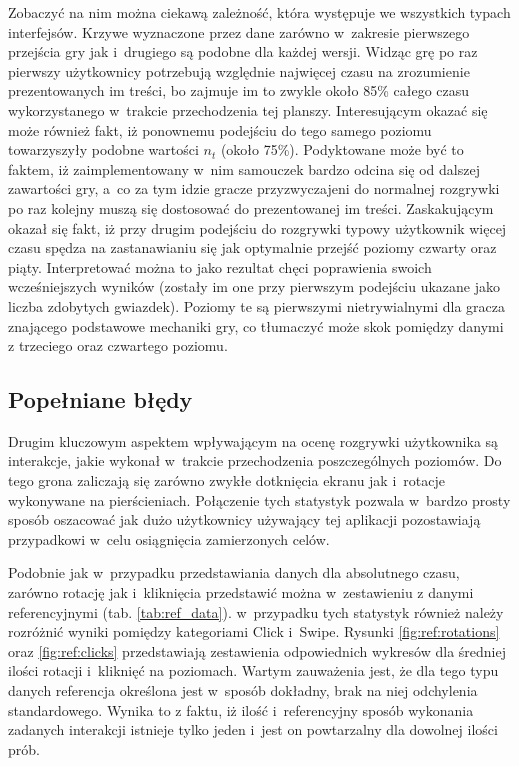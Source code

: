 \documentclass[a4paper,12pt,numbers=noenddot]{report}
\begin{document}
Zobaczyć na nim można ciekawą zależność, która występuje we wszystkich typach interfejsów. Krzywe wyznaczone przez dane zarówno w~zakresie pierwszego przejścia gry jak i~drugiego są podobne dla każdej wersji. Widząc grę po raz pierwszy użytkownicy potrzebują względnie najwięcej czasu na zrozumienie prezentowanych im treści, bo zajmuje im to zwykle około 85\% całego czasu wykorzystanego w~trakcie przechodzenia tej planszy. Interesującym okazać się może również fakt, iż ponownemu podejściu do tego samego poziomu towarzyszyły podobne wartości $n_{t}$ (około 75\%). Podyktowane może być to faktem, iż zaimplementowany w~nim samouczek bardzo odcina się od dalszej zawartości gry, a~co za tym idzie gracze przyzwyczajeni do normalnej rozgrywki po raz kolejny muszą się dostosować do prezentowanej im treści.
Zaskakującym okazał się fakt, iż przy drugim podejściu do rozgrywki typowy użytkownik więcej czasu spędza na zastanawianiu się jak optymalnie przejść poziomy czwarty oraz piąty. Interpretować można to jako rezultat chęci poprawienia swoich wcześniejszych wyników (zostały im one przy pierwszym podejściu ukazane jako liczba zdobytych gwiazdek). Poziomy te są pierwszymi nietrywialnymi dla gracza znającego podstawowe mechaniki gry, co tłumaczyć może skok pomiędzy danymi z trzeciego oraz czwartego poziomu. \\

\subsection{Popełniane błędy}
Drugim kluczowym aspektem wpływającym na ocenę rozgrywki użytkownika są interakcje, jakie wykonał w~trakcie przechodzenia poszczególnych poziomów. Do tego grona zaliczają się zarówno zwykłe dotknięcia ekranu jak i~rotacje wykonywane na pierścieniach. Połączenie tych statystyk pozwala w~bardzo prosty sposób oszacować jak dużo użytkownicy używający tej aplikacji pozostawiają przypadkowi w~celu osiągnięcia zamierzonych celów. 

Podobnie jak w~przypadku przedstawiania danych dla absolutnego czasu, zarówno rotację jak i~kliknięcia przedstawić można w~zestawieniu z danymi referencyjnymi (tab. \ref{tab:ref_data}). w~przypadku tych statystyk również należy rozróżnić wyniki pomiędzy kategoriami Click i~Swipe. Rysunki
\ref{fig:ref:rotations} oraz \ref{fig:ref:clicks} przedstawiają zestawienia odpowiednich wykresów dla średniej ilości rotacji i~kliknięć na poziomach. Wartym zauważenia jest, że dla tego typu danych referencja określona jest w~sposób dokładny, brak na niej odchylenia standardowego. Wynika to z faktu, iż ilość i~referencyjny sposób wykonania zadanych interakcji istnieje tylko jeden i~jest on powtarzalny dla dowolnej ilości prób.
\end{document}
